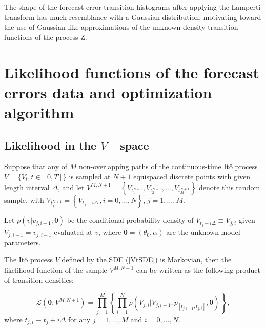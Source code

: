 \documentclass[11pt]{article}
\theoremstyle{definition}
\begin{document}
The shape of the forecast error transition histograms after applying the Lamperti transform has much resemblance with a Gaussian distribution, motivating toward the use of Gaussian-like approximations of the unknown density transition functions of the process Z.




\section{ Likelihood functions of the forecast errors data and optimization algorithm} \label{Section_5} 

\subsection{Likelihood in the $V-$space}

Suppose that any of $M$ non-overlapping paths of the continuous-time It\^{o} process $V = \{ V_t, t  \in [0,T] \}$ is sampled at $N + 1$ equispaced discrete points with given length interval $\Delta$, and let $ V^{M,N + 1}=\left\{ V_{t_1^{N + 1}} , V_{t_2^{N + 1}} ,\ldots , V_{t_M^{N + 1}} \right\}$ denote this random sample, with $V_{t_j^{N + 1}} =\left\{ V_{t_j + i \Delta}\,, i = 0, \ldots, N \right\}, \, j = 1, \ldots, M$. 

Let $\rho(v \vert v_{j, i-1} ; \bm{\theta})$ be the conditional probability density of $V_{t_j + i \Delta} \equiv V_{j, i}$ given $V_{j, i-1} = v_{j, i-1}$ evaluated at $v$, where $\bm{\theta} = (\theta_0, \alpha)$ are the unknown model parameters.

The It\^{o} process $V$ defined by the SDE (\ref{VtSDE}) is Markovian, then the likelihood function of the sample $ V^{M,N + 1}$ can be written as the following product of transition densities:  

\begin{equation}
\mathcal{L}(\bm{\theta}; V^{M,N +1}) = \prod\limits_{j=1}^M \left\{ \prod\limits_{i=1}^N \rho ( {V_{j, i}| V_{j, i-1}} ; p_{[t_{j,  i-1}, t_{j , i} ]},  \bm{\theta} )  \,  \right\},
\label{likelihood}
\end{equation}
where $t_{j ,i} \equiv  t_j + i \Delta$ for any $j = 1, \ldots, M$ and $i = 0, \ldots, N$. \\
\end{document}
